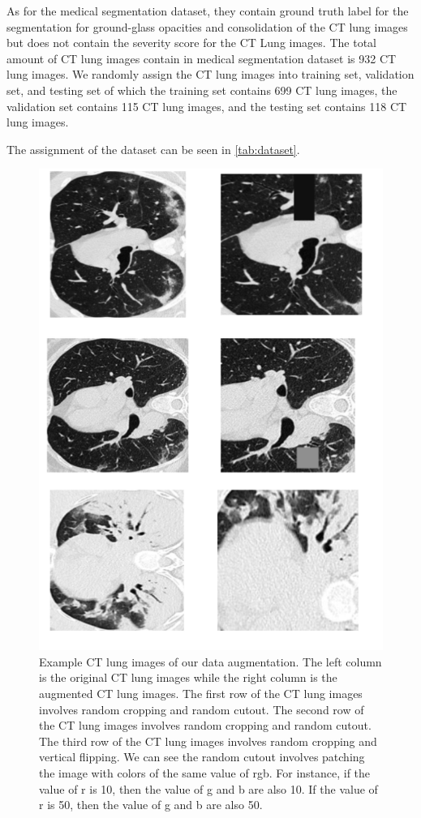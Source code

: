 As for the medical segmentation dataset, they contain ground truth label for the segmentation for ground-glass opacities and consolidation of the CT lung images but does not contain the severity score for the CT Lung images. The total amount of CT lung images contain in medical segmentation dataset is 932 CT lung images. We randomly assign the CT lung images into training set, validation set, and testing set of which the training set contains 699 CT lung images, the validation set contains 115 CT lung images, and the testing set contains 118 CT lung images. 

The assignment of the dataset can be seen in \ref{tab:dataset}.


\begin{figure}
	\centering
	\includegraphics[width=\linewidth]{data_aug.png}
	\caption{Example CT lung images of our data augmentation. The left column is the original CT lung images while the right column is the augmented CT lung images. The first row of the CT lung images involves random cropping and random cutout. The second row of the CT lung images involves random cropping and random cutout. The third row of the CT lung images involves random cropping and vertical flipping. We can see the random cutout involves patching the image with colors of the same value of rgb. For instance, if the value of r is 10, then the value of g and b are also 10. If the value of r is 50, then the value of g and b are also 50.}
	\label{fig:data_aug}
\end{figure}

